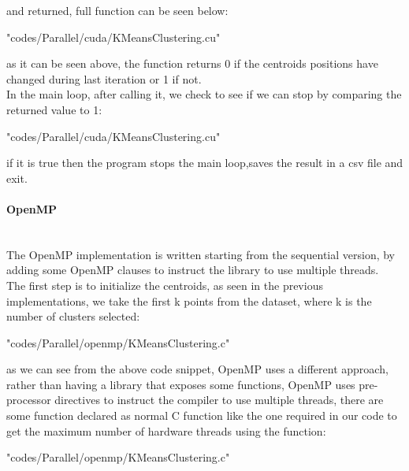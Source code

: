 \documentclass[10pt,twocolumn,letterpaper]{article}
\newcommand{\nlparagraph}[1]{\paragraph{#1}\mbox{}\\}
\begin{document}
and returned, full function can be seen below:\\
\begin{lstinputlisting}[language=C,style=CSnippetStyle,caption=CUDA Exit Condition Kernel Launcher,firstline=116,lastline=131]{
	"codes/Parallel/cuda/KMeansClustering.cu"}
\end{lstinputlisting}
as it can be seen above, the function returns 0 if the centroids positions have changed during last iteration or 1 if not.\\
In the main loop, after calling it, we check to see if we can stop by comparing the returned value to 1:\\
\begin{lstinputlisting}[language=C,style=CSnippetStyle,caption=CUDA Exit Condition,firstline=290,lastline=293]{
	"codes/Parallel/cuda/KMeansClustering.cu"}
\end{lstinputlisting}
if it is true then the program stops the main loop,saves the result in a csv file and exit.\\
\nlparagraph{OpenMP}
The OpenMP implementation is written starting from the sequential version, by adding some OpenMP clauses to instruct the library to use
multiple threads.\\
The first step is to initialize the centroids, as seen in the previous implementations, we take the first k points from the 
dataset, where k is the number of clusters selected:\\

\begin{lstinputlisting}[language=C,style=CSnippetStyle,caption=OpenMP Centroid Initialization,firstline=19,lastline=24]{
	"codes/Parallel/openmp/KMeansClustering.c"}
\end{lstinputlisting}

as we can see from the above code snippet, OpenMP uses a different approach, rather than having a library that exposes some 
functions, OpenMP uses pre-processor directives to instruct the compiler to use multiple threads, there are some function 
declared as normal C function like the one required in our code to get the maximum number of hardware threads using the 
function:\\

\begin{lstinputlisting}[language=C,style=CSnippetStyle,caption=OpenMP Get Max Number of Threads Function,firstline=17,lastline=17]{"codes/Parallel/openmp/KMeansClustering.c"}
\end{lstinputlisting}
\end{document}
